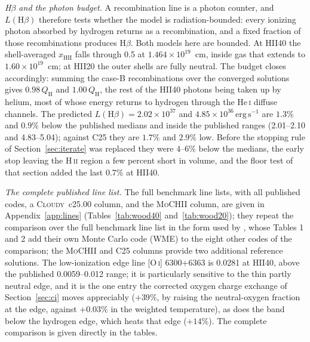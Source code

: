 \documentclass[twocolumn,linenumbers]{aastex702}
\newcommand{\MoCHII}{\textsc{MoCHII}}
\newcommand{\HeI}{He\,\textsc{i}}
\newcommand{\QH}{Q_{\mathrm{H}}}
\begin{document}
\emph{H$\beta$ and the photon budget.}  A recombination line is a photon
counter, and $L(\mathrm{H}\beta)$ therefore tests whether the model is
radiation-bounded: every ionizing photon absorbed by hydrogen returns as a
recombination, and a fixed fraction of those recombinations produces
H$\beta$.  Both models here are bounded.  At HII40 the shell-averaged
$x_{\mathrm{HII}}$ falls through 0.5 at $1.464\times10^{19}$~cm, inside gas
that extends to $1.60\times10^{19}$~cm; at HII20 the outer shells are fully
neutral.  The budget closes accordingly: summing the case-B recombinations
over the converged solutions gives $0.98\,\QH$ and $1.00\,\QH$, the rest of
the HII40 photons being taken up by helium, most of whose energy returns to
hydrogen through the \HeI{} diffuse channels.  The predicted
$L(\mathrm{H}\beta) = 2.02\times10^{37}$ and
$4.85\times10^{36}\,\mathrm{erg\,s^{-1}}$ are $1.3\%$ and $0.9\%$ below the
published medians and inside the published ranges (2.01--2.10 and
4.83--5.04); against C25 they are $1.7\%$ and $2.9\%$ low.  Before the
stopping rule of Section~\ref{sec:iterate} was replaced they were
$4$--$6\%$ below the medians, the early stop leaving the H\,\textsc{ii}
region a few percent short in volume, and the floor test of that section
added the last $0.7\%$ at HII40.

\emph{The complete published line list.}  The full benchmark line lists,
with all published codes, a \textsc{Cloudy}~c25.00 column, and the
\MoCHII{} column, are given in Appendix~\ref{app:lines}
(Tables~\ref{tab:wood40} and~\ref{tab:wood20}); they repeat the comparison
over the full benchmark line list in
the form used by \citet{wood2004}, whose Tables 1 and 2 add their own Monte
Carlo code (WME) to the eight other codes of the comparison; the
\MoCHII{} and C25 columns provide two additional reference solutions.  The
low-ionization edge line [O\,\textsc{i}]
6300+6363 is 0.0281 at HII40, above the published 0.0059--0.012 range; it is
particularly sensitive to the thin partly neutral edge, and it is the one
entry the corrected oxygen charge exchange of Section~\ref{sec:ci} moves
appreciably ($+39\%$, by raising the neutral-oxygen fraction at the edge,
against $+0.03\%$ in the weighted temperature), as does the band below the
hydrogen edge, which heats that edge ($+14\%$).  The complete
comparison is given directly in the tables.
\end{document}
